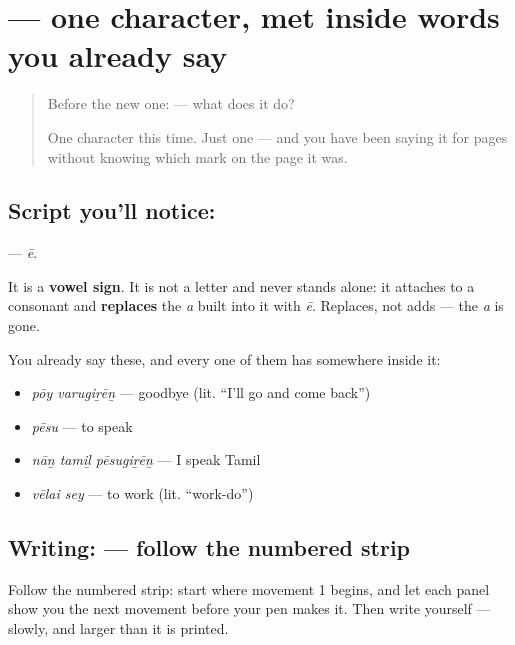 \section[\texorpdfstring{\ta{ே} (ē)}{ே (ē)}]{ — one character, met inside words you already say}

\label{lesson:TA-S123-vowel-sign-ee}



\begin{quote}
Before the new one:  — what does it do?

One character this time. Just one — and you have been saying it for pages without knowing which mark on the page it was.
\end{quote}

\subsection*{Script you'll notice: }
\textbf{} — \emph{ē}.

It is a \textbf{vowel sign}. It is not a letter and never stands alone: it attaches to a consonant and \textbf{replaces} the \emph{a} built into it with \emph{ē}. Replaces, not adds — the \emph{a} is gone.

You already say these, and every one of them has  somewhere inside it:

\begin{itemize}
\raggedright
  \item \textbf{ } \emph{pōy varugiṟēṉ} — goodbye (lit. \textquotedblleft{}I'll go and come back\textquotedblright{})
  \item \textbf{} \emph{pēsu} — to speak
  \item \textbf{  } \emph{nāṉ tamiḻ pēsugiṟēṉ} — I speak Tamil
  \item \textbf{ } \emph{vēlai sey} — to work (lit. \textquotedblleft{}work-do\textquotedblright{})
\end{itemize}

\subsection*{Writing:  — follow the numbered strip}

Follow the numbered strip: start where movement 1 begins, and let each panel show you the next movement before your pen makes it. Then write  yourself — slowly, and larger than it is printed.

